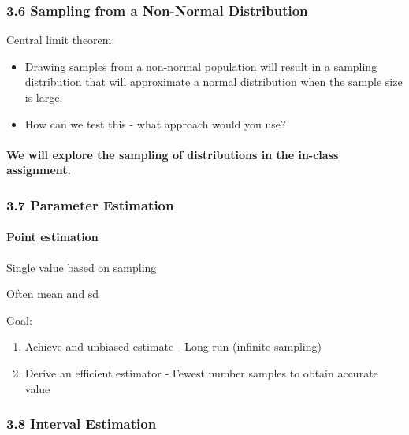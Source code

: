 \documentclass[]{article}
\providecommand{\tightlist}{%
  \setlength{\itemsep}{0pt}\setlength{\parskip}{0pt}}
\let\oldparagraph\paragraph
\renewcommand{\paragraph}[1]{\oldparagraph{#1}\mbox{}}
\begin{document}
\hypertarget{sampling-from-a-non-normal-distribution}{%
\subsubsection{3.6 Sampling from a Non-Normal
Distribution}\label{sampling-from-a-non-normal-distribution}}

Central limit theorem:

\begin{itemize}
\tightlist
\item
  Drawing samples from a non-normal population will result in a sampling
  distribution that will approximate a normal distribution when the
  sample size is large.
\item
  How can we test this - what approach would you use?
\end{itemize}

\hypertarget{we-will-explore-the-sampling-of-distributions-in-the-in-class-assignment.}{%
\paragraph{We will explore the sampling of distributions in the in-class
assignment.}\label{we-will-explore-the-sampling-of-distributions-in-the-in-class-assignment.}}

\hypertarget{parameter-estimation}{%
\subsubsection{3.7 Parameter Estimation}\label{parameter-estimation}}

\hypertarget{point-estimation}{%
\paragraph{Point estimation}\label{point-estimation}}

Single value based on sampling

Often mean and sd

Goal:

\begin{enumerate}
\def\labelenumi{\arabic{enumi}.}
\tightlist
\item
  Achieve and unbiased estimate - Long-run (infinite sampling)
\item
  Derive an efficient estimator - Fewest number samples to obtain
  accurate value
\end{enumerate}

\hypertarget{interval-estimation}{%
\subsubsection{3.8 Interval Estimation}\label{interval-estimation}}
\end{document}
